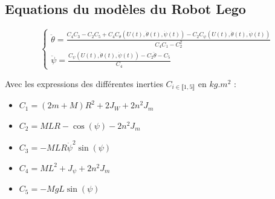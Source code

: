 \documentclass[a4paper]{article}
\begin{document}
                \subsection{Equations du modèles du Robot Lego}
                \label{equations_robot_lego}

                        $$
                        \begin{cases}
                                \ddot \theta = \frac{C_4 C_3 - C_2 C_5 + C_4 C_{\theta} (U(t), \dot \theta (t), \dot \psi (t)) - C_2 C_{\psi} (U(t), \dot \theta (t), \dot \psi (t))}{C_4 C_1 - C_2^2} \\
                                \ddot \psi = \frac{C_{\psi} (U(t), \dot \theta (t), \dot \psi (t)) - C_2 \ddot \theta - C_5}{C_4}
                        \end{cases}
                        $$

                        Avec les expressions des différentes inerties $C_{i \in \llbracket 1,5 \rrbracket}$ en $kg.m^2$ :
                        \begin{itemize}
                                \item $C_1 = (2m + M)R^2 + 2J_W + 2n^2 J_m$
                                \item $C_2 = MLR - \cos (\psi) - 2n^2 J_m$
                                \item $C_3 = -MLR \dot \psi^2 \sin (\psi)$
                                \item $C_4 = ML^2 + J_{\psi} + 2n^2 J_m$
                                \item $C_5 = -MgL \sin (\psi)$
                        \end{itemize}
\end{document}
